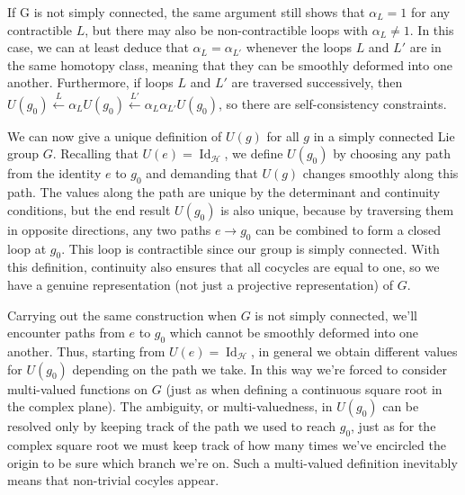 \documentclass{article}
\theoremstyle{plain}\theoremheaderfont{\normalfont\itshape}\theorembodyfont{\rmfamily}\theoremseparator{.}\newtheorem*{rem}{Remark}\newtheorem*{ex}{Example}\newtheorem*{proof}{Proof}\newtheorem*{altp}{Alternative proof}
\theoremstyle{plain}\theoremheaderfont{\normalfont\bfseries}\theorembodyfont{\rmfamily}\theoremseparator{.}\newtheorem{thm}{Theorem}[section]\newtheorem{lem}[thm]{Lemma}\newtheorem{prop}[thm]{Proposition}\newtheorem*{cor}{Corollary}\newtheorem{defn}[thm]{Definition}\newtheorem{clm}[thm]{Claim}\newtheorem{clminproof}{Claim}
\theoremstyle{break}\theoremheaderfont{\normalfont\itshape}\theorembodyfont{\rmfamily}\theoremseparator{.\medskip}\newtheorem*{proofskip}{Proof}\newtheorem*{exs}{Examples}\newtheorem*{rems}{Remarks}
\theoremstyle{break}\theoremheaderfont{\normalfont\bfseries}\theorembodyfont{\rmfamily}\theoremseparator{.\medskip}\newtheorem{lemskip}[thm]{Lemma}\newtheorem{defnskip}[thm]{Definition}\newtheorem{propskip}[thm]{Proposition}\newtheorem{thmskip}[thm]{Theorem}
\numberwithin{equation}{section}
\newcommand{\hb}{\mathcal{H}}
\DeclareMathOperator{\Id}{Id}
\begin{document}
    If G is not simply connected, the same argument still shows that \(\alpha_L=1\) for any contractible \(L\), but there may also be non-contractible loops with \(\alpha_L\ne 1\). In this case, we can at least deduce that \(\alpha_L=\alpha_{L'}\) whenever the loops \(L\) and \(L'\) are in the same homotopy class, meaning that they can be smoothly deformed into one another. Furthermore, if loops \(L\) and \(L'\) are traversed successively, then \(U(g_0)\xleftarrow{L}\alpha_L U(g_0)\xleftarrow{L'}\alpha_L\alpha_{L'}U(g_0)\), so there are self-consistency constraints.

    We can now give a unique definition of \(U(g)\) for all \(g\) in a simply connected Lie group \(G\). Recalling that \(U(e)=\Id_\hb\), we define \(U(g_0)\) by choosing any path from the identity \(e\) to \(g_0\) and demanding that \(U(g)\) changes smoothly along this path. The values along the path are unique by the determinant and continuity conditions, but the end result \(U(g_0)\) is also unique, because by traversing them in opposite directions, any two paths \(e\to g_0\) can be combined to form a closed loop at \(g_0\). This loop is contractible since our group is simply connected. With this definition, continuity also ensures that all cocycles are equal to one, so we have a genuine representation (not just a projective representation) of \(G\).

    Carrying out the same construction when \(G\) is not simply connected, we'll encounter paths from \(e\) to \(g_0\) which cannot be smoothly deformed into one another. Thus, starting from \(U(e)=\Id_\hb\), in general we obtain different values for \(U(g_0)\) depending on the path we take. In this way we're forced to consider multi-valued functions on \(G\) (just as when defining a continuous square root in the complex plane). The ambiguity, or multi-valuedness, in \(U(g_0)\) can be resolved only by keeping track of the path we used to reach \(g_0\), just as for the complex square root we must keep track of how many times we've encircled the origin to be sure which branch we're on. Such a multi-valued definition inevitably means that non-trivial cocyles appear.
\end{document}
